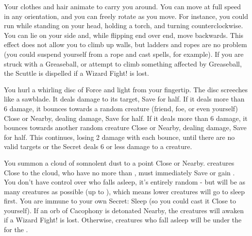 \WIZARDRY[
  Name=Scuttle,
  Link=secrets-scuttle,
  Alignment=Biomancy,
  Save=N,
  Duration=Combat or \SUMDICE real-world minutes,
  Counter=\mylink{Greaseball}{secrets-greaseball} ,
  Keywords=None,
  Target=Self
]


Your clothes and hair animate to carry you around. You can move at full speed in any orientation, and you can freely rotate as you move. For
instance, you could run while standing on your head, holding a torch, and turning counterclockwise. You can lie on your side and, while flipping end
over end, move backwards. This effect does not allow you to climb up walls, but ladders and ropes are no problem (you could suspend yourself from a rope
and cast spells, for example).  If you are struck with a Greaseball, or attempt to climb something affected by Greaseball, the Scuttle is dispelled if a Wizard Fight! is lost.




\WIZARDRY[
  Name=Scything Disc of Nog,
  Link=secrets-scything-disc-of-nog,
  Alignment=Force,
  Save=Y (half),
  Duration=0,
  Counter=None ,
  Keywords=None,
  Target=Nearby or Far Away Area
]

You hurl a whirling disc of Force and light from your fingertip. The disc screeches like a sawblade. It deals \SUMDICE damage to its target, Save for
half. If it deals more than 6 damage, it bounces towards a random creature (friend, foe, or even yourself) Close or Nearby, dealing 
damage, Save for half. If it deals more than 6 damage, it bounces towards another random creature Close or Nearby, dealing  damage, Save for
half. This continues, losing 2 damage with each bounce, until there are no valid targets or the Secret deals 6 or less damage to a creature.


\WIZARDRY[
  Name=Sleep,
  Link=secrets-sleep,
  Alignment=Mind,
  Save=Y (negate),
  Duration=\DICE,
  Counter=\mylink{Cacophony}{secrets-cacophony} ,
  Keywords=None,
  Target=Close or Nearby Area
]

You summon a cloud of somnolent dust to a point Close or Nearby. \SUMDICE creatures Close to the cloud, who have no more than \DICE {}, must
immediately Save or gain . You don't have control over who falls asleep, it's entirely random - but will be as many creatures as possible (up to \SUMDICE), which means lower \HD creatures will go to sleep first.  You are immune to your own Secret: Sleep (so you could cast it Close to yourself).  If an orb of Cacophony is detonated Nearby, the creatures will awaken if a Wizard Fight! is lost.  Otherwise, creatures who fall asleep will be under the  for the \Duration.  


